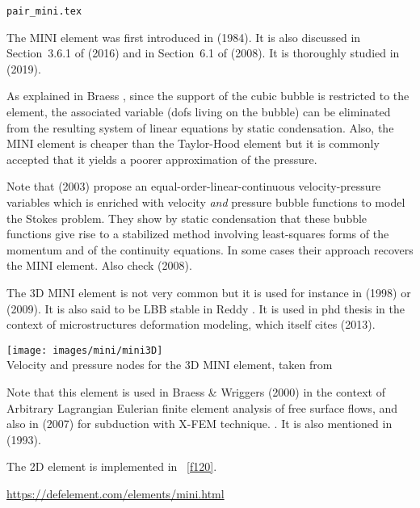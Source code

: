 \begin{flushright} {\tiny {\color{gray} \tt pair\_mini.tex}} \end{flushright}

\noindent
\begin{minipage}{0.48\textwidth}
The  MINI element was first introduced in 
\textcite{arbf84} (1984).
It is also discussed in Section~3.6.1 of \textcite{john16} (2016) and in Section~6.1 
of \textcite{bobf08} (2008). It is thoroughly studied in \textcite{cibo19} (2019).

As explained in Braess \cite{braess}, since the support of the cubic bubble is restricted to the element, 
the associated variable (dofs living on the bubble) can be eliminated from the resulting 
system of linear equations by static condensation. 
Also, the MINI element is cheaper than the Taylor-Hood element but it is commonly accepted
that it yields a poorer approximation of the pressure.
\end{minipage}\hfill
\begin{minipage}{0.48\textwidth}

\end{minipage}

\begin{remark}
Note that \textcite{frol03} (2003) propose an equal-order-linear-continuous 
velocity-pressure variables which is enriched 
with velocity {\it and} pressure bubble functions to model the Stokes problem. 
They show by static condensation that
these bubble functions give rise to a stabilized method involving least-squares forms of 
the momentum and of the
continuity equations. In some cases their approach recovers 
the MINI element. Also check \textcite{gamt08} (2008).
\end{remark}

The 3D MINI element is not very common but it is used for instance in \textcite{pico98} (1998) or
\textcite{tokv09} (2009). 
It is also said to be LBB stable in Reddy \cite[p180]{reddybook2}.
It is used in \cite{furstoss} phd thesis in the context of microstructures deformation modeling, 
which itself cites \textcite{camb13} (2013).

\begin{center}
\texttt{[image: images/mini/mini3D]}\\
{\captionfont Velocity and pressure nodes for the 3D MINI element, taken from \cite{pico98}}
\end{center}

Note that this element is used in Braess \& Wriggers (2000) \cite{brwr00} 
in the context of Arbitrary Lagrangian Eulerian 
finite element analysis of free surface flows, and also 
in \textcite{zldf07} (2007) for subduction with X-FEM technique. 
. It is also mentioned in \textcite{nath93} (1993).

The 2D element is implemented in \stone~\ref{f120}.

\url{https://defelement.com/elements/mini.html}
